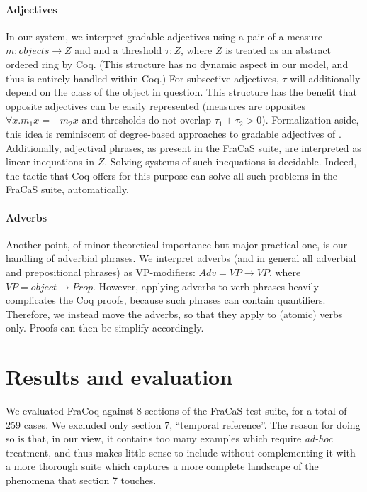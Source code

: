 \documentclass[11pt]{article}
\begin{document}
\paragraph{Adjectives}
In our system, we interpret gradable adjectives using a pair of a
measure $m : objects → Z$ and and a threshold $τ : Z$, where $Z$ is
treated as an abstract ordered ring by Coq. (This structure has no
dynamic aspect in our model, and thus is entirely handled within Coq.)
For subsective adjectives, $τ$ will additionally depend on the class
of the object in question. This structure has the benefit that
opposite adjectives can be easily represented (measures are opposites
$∀x. m_1 x = -m_2 x$ and thresholds do not overlap $τ_1 + τ_2 >
0$). Formalization aside, this idea is reminiscent of degree-based
approaches to gradable adjectives of
\citet{Cresswell:1976,Kennedy:2007}.  Additionally,
adjectival phrases, as present in the FraCaS suite, are interpreted as
linear inequations in $Z$. Solving systems of such inequations is
decidable. Indeed, the tactic that Coq offers for this purpose can
solve all such problems in the FraCaS suite, automatically.


\paragraph{Adverbs}
Another point, of minor theoretical importance but major practical
one, is our handling of adverbial phrases. We interpret adverbs (and
in general all adverbial and prepositional phrases) as VP-modifiers:
$Adv = VP → VP$, where $VP = object → Prop$. However, applying adverbs
to verb-phrases heavily complicates the Coq proofs, because such
phrases can contain quantifiers. Therefore, we instead move the
adverbs, so that they apply to (atomic) verbs only. Proofs can then be
simplify accordingly. 



\section{Results and evaluation}

We evaluated FraCoq against 8 sections of the FraCaS test suite, for a
total of 259 cases. We excluded only section 7, ``temporal reference''. The reason for
doing so is that, in our view, it contains too many examples which
require \textit{ad-hoc} treatment, and thus makes little sense to
include without complementing it with a more thorough suite which
captures a more complete landscape of the phenomena that section 7
touches.
\end{document}
